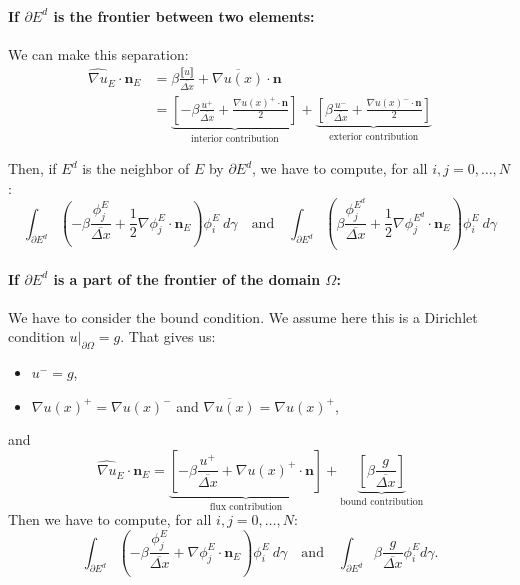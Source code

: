 \documentclass[a4paper,10pt]{article}
\begin{document}
\paragraph{If $\partial E^d$ is the frontier between two elements:}

We can make this separation:
\begin{align*}
 \widehat{\nabla u}_E \cdot \mathbf{n}_E 
 &= \beta \frac{\llbracket u \rrbracket}{\overline{\Delta x}} + \overline{\nabla u(x)} \cdot 
\mathbf{n} \\
&= \underbrace{ \left[-\beta \frac{u^+}{\overline{\Delta x}} + \frac{ \nabla u(x)^+ \cdot 
\mathbf{n}}{2} \right]}_{ \text{interior contribution} } 
+ \underbrace{\left[ \beta \frac{u^-}{\overline{\Delta x}} + \frac{ \nabla u(x)^- \cdot 
\mathbf{n}}{2} \right]}_{ \text{exterior contribution} }
\end{align*}

Then, if $E^d$ is the neighbor of $E$ by $\partial E^d$, we have to compute, for all $i,j 
=0,\dots,N$:
\begin{equation*}
 \int_{\partial E^d} \left( - \beta \frac{\phi_j^E}{\overline{\Delta x}}  + \frac{1}{2} \nabla 
\phi_j^E \cdot \mathbf{n}_E \right) \phi_i^E \ d \gamma
\quad \text{and} \quad
\int_{\partial E^d} \left( \beta \frac{\phi_j^{E^d}}{\overline{\Delta x}}  + \frac{1}{2} \nabla 
\phi_j^{E^d} \cdot \mathbf{n}_E \right) \phi_i^E \ d \gamma
\end{equation*}

\paragraph{If $\partial E^d$ is a part of the frontier of the domain $\Omega$:}
We have to consider the bound condition. We assume here this is a Dirichlet condition 
$u|_{\partial \Omega} = g$. That gives us:
\begin{itemize}
 \item $u^- = g$,
 \item $\nabla u(x)^+ = \nabla u(x)^-$ and $\overline{\nabla u(x)} = \nabla u(x)^+$,
\end{itemize}
and
\begin{equation*}
 \widehat{\nabla u}_E \cdot \mathbf{n}_E 
 = \underbrace{\left[ -\beta \frac{u^+}{\overline{\Delta x}} + \nabla u(x)^+ \cdot 
\mathbf{n} \right]}_{\text{flux contribution}}
+ \underbrace{\left[ \beta \frac{g}{\overline{\Delta x}} \right]}_{\text{bound contribution}}
\end{equation*}
Then we have to compute, for all $i,j=0,\dots,N$:
\begin{equation*}
\int_{\partial E^d} \left( - \beta \frac{\phi_j^E}{\overline{\Delta x}}  + \nabla 
\phi_j^E \cdot \mathbf{n}_E \right) \phi_i^E \ d \gamma
\quad \text{and} \quad
\int_{\partial E^d} \beta \frac{g}{\overline{\Delta x}} \phi_i^E d\gamma.
\end{equation*}
\end{document}

